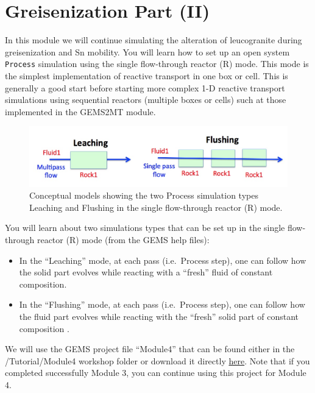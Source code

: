 \documentclass[
]{book}
\begin{document}
\hypertarget{module4}{%
\chapter{Greisenization Part (II)}\label{module4}}

In this module we will continue simulating the alteration of leucogranite during greisenization and Sn mobility. You will learn how to set up an open system \texttt{Process} simulation using the single flow-through reactor (R) mode. This mode is the simplest implementation of reactive transport in one box or cell. This is generally a good start before starting more complex 1-D reactive transport simulations using sequential reactors (multiple boxes or cells) such at those implemented in the GEMS2MT module.

\begin{figure}
\includegraphics[width=1\linewidth]{figures/module4/fig-1} \caption{Conceptual models showing the two Process simulation types Leaching and Flushing in the single flow-through reactor (R) mode. }\label{fig:fig-1d}
\end{figure}

You will learn about two simulations types that can be set up in the single flow-through reactor (R) mode (from the GEMS help files):

\begin{itemize}
\item
  In the ``Leaching'' mode, at each pass (i.e.~Process step), one can follow how the solid part evolves while reacting with a ``fresh'' fluid of constant composition.
\item
  In the ``Flushing'' mode, at each pass (i.e.~Process step), one can follow how the fluid part evolves while reacting with the ``fresh'' solid part of constant composition .
\end{itemize}

We will use the GEMS project file ``Module4'' that can be found either in the /Tutorial/Module4 workshop folder or download it directly \href{https://geoinfo.nmt.edu/mines-tdb/GEMS-files/Module4.zip}{here}. Note that if you completed successfully Module 3, you can continue using this project for Module 4.
\end{document}
